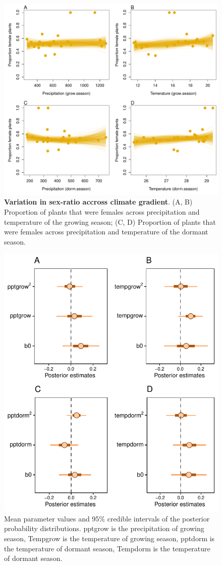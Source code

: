 \documentclass[12pt]{article}
\begin{document}
\begin{figure}[H]
  \begin{center}
    \includegraphics[width=0.95\linewidth]{Figures/gardens_SR.pdf}
  \caption{\textbf{Variation in sex-ratio accross climate gradient}.
  (A, B) Proportion of plants that were females across precipitation and temperature of the growing season; (C, D) Proportion of plants that were females across precipitation and temperature of the dormant season.}
  \label{Sup:gardens_SR}
  \end{center}
\end{figure}

\begin{figure}[H]
		\centering
		\includegraphics[width=0.75\linewidth]{Figures/Posterior_SR.pdf}
		\caption{Mean parameter values and 95\% credible intervals of the posterior probability distributions. 
		pptgrow is  the precipitation of growing season,
		Tempgrow is the temperature of growing season,
		pptdorm is the temperature of dormant season,
		Tempdorm is the temperature of dormant season.}
		\label{Sup:PosteriorSR}
\end{figure}
	
\end{document}
